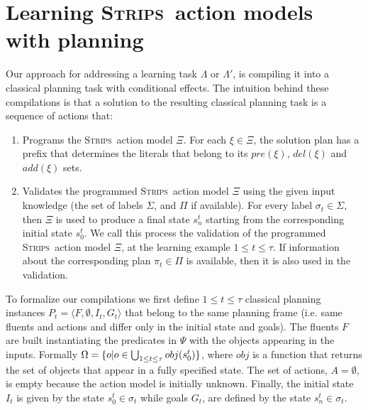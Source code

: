 \documentclass[letterpaper]{article} %
\newcommand{\tup}[1]{{\langle #1 \rangle}}
\newcommand{\strips}{\textsc{Strips}}     %
\begin{document}
\section{Learning \strips\ action models with planning}
Our approach for addressing a learning task $\Lambda$ or $\Lambda'$, is compiling it into a classical planning task with conditional effects. The intuition behind these compilations is that a solution to the resulting classical planning task is a sequence of actions that:
\begin{enumerate}
\item Programs the \strips\ action model $\Xi$. For each $\xi\in\Xi$, the solution plan has a prefix that determines the literals that belong to its $pre(\xi)$, $del(\xi)$ and $add(\xi)$ sets.
\item Validates the programmed \strips\ action model $\Xi$ using the given input knowledge (the set of labels $\Sigma$, and $\Pi$ if available).  For every label $\sigma_t\in \Sigma$, then $\Xi$ is used to produce a final state $s_{n}^t$ starting from the corresponding initial state $s_0^t$. We call this process the validation of the programmed \strips\ action model $\Xi$, at the learning example {\small $1\leq t\leq \tau$}. If information about the corresponding plan $\pi_t\in \Pi$ is available, then it is also used in the validation.
\end{enumerate}

To formalize our compilations we first define {\small $1\leq t\leq \tau$} classical planning instances $P_t=\tup{F,\emptyset,I_t,G_t}$ that belong to the same planning frame (i.e. same fluents and actions and differ only in the initial state and goals). The fluents $F$ are built instantiating the predicates in $\Psi$ with the objects appearing in the inputs. Formally $\Omega=\{o|o\in \bigcup_{\small 1\leq t\leq \tau} obj(s_0^t)\}$, where $obj$ is a function that returns the set of objects that appear in a fully specified state. The set of actions, $A=\emptyset$, is empty because the action model is initially unknown. Finally, the initial state $I_t$ is given by the state $s_0^t\in \sigma_t$ while goals $G_t$, are defined by the state $s_n^t\in \sigma_t$.
\end{document}
